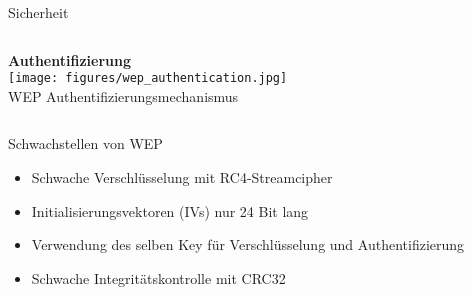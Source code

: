 {\begin{frame}{Sicherheit}
\begin{columns}
        \begin{column}{.4\textwidth}
           \centering
           \textbf{Authentifizierung}
           \\\vspace{0.6cm}
           \texttt{[image: figures/wep\_authentication.jpg]}
           \tiny
           \\WEP Authentifizierungsmechanismus
        \end{column}
    \end{columns}
\end{frame}

\begin{frame}{Schwachstellen von WEP}
\begin{itemize}
    \setlength{\itemsep}{10pt}
  \item Schwache Verschlüsselung mit RC4-Streamcipher
  \item Initialisierungsvektoren (IVs) nur 24 Bit lang
  \item Verwendung des selben Key für Verschlüsselung und Authentifizierung
  \item Schwache Integritätskontrolle mit CRC32
\end{itemize}
\end{frame}

}